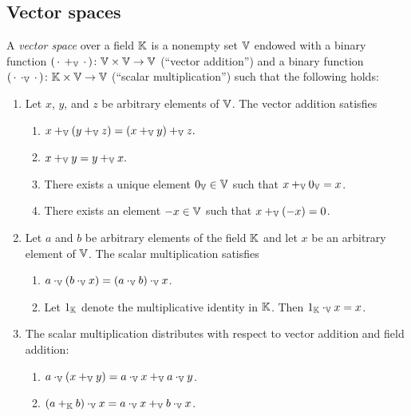 \subsection{Vector spaces}
\begin{definition}%
	\label{def:vector space}
	A \emph{vector space} over a field \( \mathbb{K} \) is a nonempty set \( \mathbb{V} \) endowed with a binary function \( (\,\cdot\, +_{\mathbb{V}} \,\cdot\,) \colon \mathbb{V} \times \mathbb{V} \to \mathbb{V} \) (\enquote{vector addition}) and a binary function \( (\,\cdot\, \cdot_{\mathbb{V}} \,\cdot\,) \colon \mathbb{K} \times \mathbb{V} \to \mathbb{V} \) (\enquote{scalar multiplication}) such that the following holds:
	\begin{enumerate}
		\item Let \( x \), \( y \), and \( z \) be arbitrary elements of \( \mathbb{V} \). The vector addition satisfies
		\begin{enumerate}
			\item \( x +_{\mathbb{V}} (y +_{\mathbb{V}} z) = (x +_{\mathbb{V}} y) +_{\mathbb{V}} z. \)
			\item \( x +_{\mathbb{V}} y = y +_{\mathbb{V}} x. \)
			\item There exists a unique element \( \num{0}_{\mathbb{V}} \in \mathbb{V} \) such that \( x +_{\mathbb{V}} \num{0}_{\mathbb{V}} = x \).
			\item There exists an element \( -x \in \mathbb{V} \) such that \( x +_{\mathbb{V}} (-x) = \num{0} \).
		\end{enumerate}
		\item Let \( a \) and \( b \) be arbitrary elements of the field \( \mathbb{K} \) and let \( x \) be an arbitrary element of \( \mathbb{V} \). The scalar multiplication satisfies
		\begin{enumerate}
			\item \( a\cdot_{\mathbb{V}}(b\cdot_{\mathbb{V}}x) = (a\cdot_{\mathbb{V}}b)\cdot_{\mathbb{V}}x \).
			\item Let \( \num{1}_{\mathbb{K}} \) denote the multiplicative identity in \( \mathbb{K} \). Then \( \num{1}_{\mathbb{K}}\cdot_{\mathbb{V}}x = x \).
		\end{enumerate}
		\item The scalar multiplication distributes with respect to vector addition and field addition:
		\begin{enumerate}
			\item \( a\cdot_{\mathbb{V}}(x +_{\mathbb{V}} y) = a\cdot_{\mathbb{V}}x +_{\mathbb{V}} a\cdot_{\mathbb{V}}y \).
			\item \( (a +_{\mathbb{K}} b)\cdot_{\mathbb{V}}x = a\cdot_{\mathbb{V}}x +_{\mathbb{V}} b\cdot_{\mathbb{V}}x \).
		\end{enumerate}
	\end{enumerate}
\end{definition}

